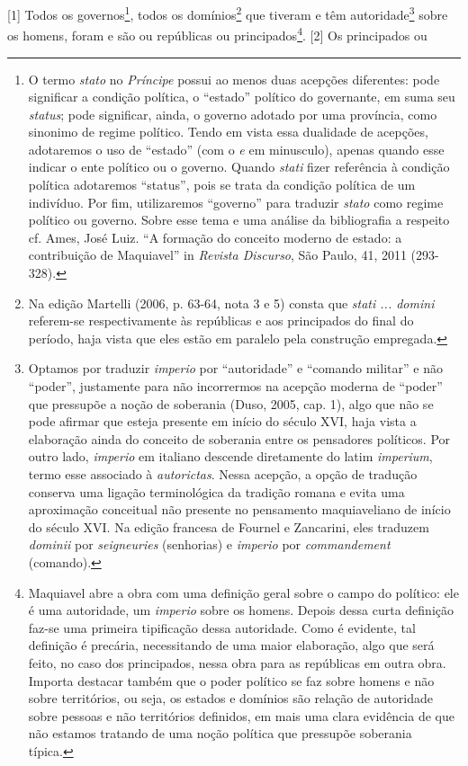 {[}1{]} Todos os governos\footnote{O termo \emph{stato} no
  \emph{Príncipe} possui ao menos duas acepções diferentes: pode
  significar a condição política, o ``estado'' político do governante,
  em suma seu \emph{status}; pode significar, ainda, o governo adotado
  por uma província, como sinonimo de regime político. Tendo em vista
  essa dualidade de acepções, adotaremos o uso de ``estado'' (com o
  \emph{e} em minusculo), apenas quando esse indicar o ente político ou
  o governo. Quando \emph{stati} fizer referência à condição política
  adotaremos ``status'', pois se trata da condição política de um
  indivíduo. Por fim, utilizaremos ``governo'' para traduzir
  \emph{stato} como regime político ou governo. Sobre esse tema e uma
  análise da bibliografia a respeito cf. Ames, José Luiz. ``A formação
  do conceito moderno de estado: a contribuição de Maquiavel'' in
  \emph{Revista Discurso}, São Paulo, 41, 2011 (293-328).}, todos os
domínios\footnote{Na edição Martelli (2006, p. 63-64, nota 3 e 5) consta
  que \emph{stati ... domini} referem-se respectivamente às repúblicas e
  aos principados do final do período, haja vista que eles estão em
  paralelo pela construção empregada.} que tiveram e têm
autoridade\footnote{Optamos por traduzir \emph{imperio} por
  ``autoridade'' e ``comando militar'' e não ``poder'', justamente para
  não incorrermos na acepção moderna de ``poder'' que pressupõe a noção
  de soberania (Duso, 2005, cap. 1), algo que não se pode afirmar que
  esteja presente em início do século XVI, haja vista a elaboração ainda
  do conceito de soberania entre os pensadores políticos. Por outro
  lado, \emph{imperio} em italiano descende diretamente do latim
  \emph{imperium}, termo esse associado à \emph{autorictas}. Nessa
  acepção, a opção de tradução conserva uma ligação terminológica da
  tradição romana e evita uma aproximação conceitual não presente no
  pensamento maquiaveliano de início do século XVI. Na edição francesa
  de Fournel e Zancarini, eles traduzem \emph{dominii} por
  \emph{seigneuries} (senhorias) e \emph{imperio} por
  \emph{commandement} (comando).} sobre os homens, foram e são ou
repúblicas ou principados\footnote{Maquiavel abre a obra com uma
  definição geral sobre o campo do político: ele é uma autoridade, um
  \emph{imperio} sobre os homens. Depois dessa curta definição faz-se
  uma primeira tipificação dessa autoridade. Como é evidente, tal
  definição é precária, necessitando de uma maior elaboração, algo que
  será feito, no caso dos principados, nessa obra para as repúblicas em
  outra obra. Importa destacar também que o poder político se faz sobre
  homens e não sobre territórios, ou seja, os estados e domínios são
  relação de autoridade sobre pessoas e não territórios definidos, em
  mais uma clara evidência de que não estamos tratando de uma noção
  política que pressupõe soberania típica.}. {[}2{]} Os principados ou
